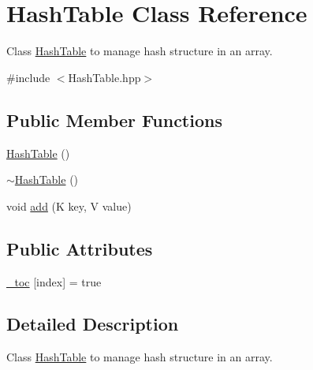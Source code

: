 \hypertarget{class_hash_table}{\section{\-Hash\-Table \-Class \-Reference}
\label{class_hash_table}
}


\-Class \hyperlink{class_hash_table}{\-Hash\-Table} to manage hash structure in an array.  




{\ttfamily \#include $<$\-Hash\-Table.\-hpp$>$}

\subsection*{\-Public \-Member \-Functions}
\begin{DoxyCompactItemize}
\item 
\hyperlink{class_hash_table_adc3bf2b214c572819ba957ad314d7db3}{\-Hash\-Table} ()
\item 
\hyperlink{class_hash_table_a9ce5569bb945880cacb29aaba6f3e3f9}{$\sim$\-Hash\-Table} ()
\item 
void \hyperlink{class_hash_table_a2f0939c844e00968dbba15040a24e013}{add} (\-K key, \-V value)
\end{DoxyCompactItemize}
\subsection*{\-Public \-Attributes}
\begin{DoxyCompactItemize}
\item 
\hyperlink{class_hash_table_a9113f13baf875cb9c461c09808983978}{\-\_\-toc} \mbox{[}index\mbox{]} = true
\end{DoxyCompactItemize}


\subsection{\-Detailed \-Description}
\-Class \hyperlink{class_hash_table}{\-Hash\-Table} to manage hash structure in an array. 

